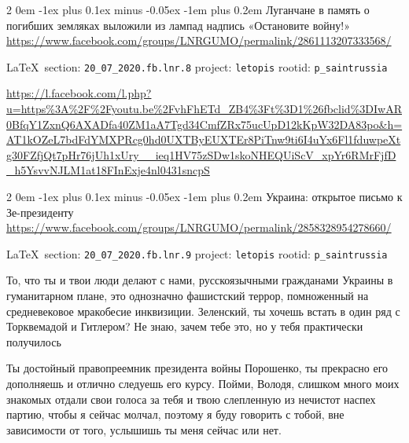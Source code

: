 \documentclass[a4paper,11pt]{extreport}
\makeatletter
\renewcommand\subsection{%
  \clearpage
    \@startsection{subsection}%
    {2}%
    {0em}%
    {-1ex plus 0.1ex minus -0.05ex}%
    {-1em plus 0.2em}%
    {\scshape\bfseries\Large}%
}
\makeatother
\begin{document}
 
 
\subsection{Луганчане в память о погибших земляках выложили из лампад надпись «Остановите войну!»}
\label{sec:20_07_2020.fb.lnr.8}
\url{https://www.facebook.com/groups/LNRGUMO/permalink/2861113207333568/}
  
\vspace{0.5cm}
{\small\LaTeX~section: \verb|20_07_2020.fb.lnr.8| project: \verb|letopis| rootid: \verb|p_saintrussia|}
\vspace{0.5cm}
  

\url{https://l.facebook.com/l.php?u=https%3A%2F%2Fyoutu.be%2FvhFhETd_ZB4%3Ft%3D1%26fbclid%3DIwAR0BfqY1ZxnQ6AXADfa40ZM1aA7Tgd34CmfZRx75ucUpD12kKpW32DA83po&h=AT1kOZeL7bdFdYMXPRcg0hd0UXTByEUXTEr8PiTnw9ti6I4uYx6Fl1fduwpeXtg30FZfjQt7pHr76jUh1xUry__ieq1HV75zSDw1skoNHEQUiScV_xpYr6RMrFjfD_h5YsvvNJLM1at18FInExje4nl0431sncpS}
 
 
\subsection{Украина: открытое письмо к Зе-президенту}
\label{sec:20_07_2020.fb.lnr.9}
\url{https://www.facebook.com/groups/LNRGUMO/permalink/2858328954278660/}
  
\vspace{0.5cm}
{\small\LaTeX~section: \verb|20_07_2020.fb.lnr.9| project: \verb|letopis| rootid: \verb|p_saintrussia|}
\vspace{0.5cm}


То, что ты и твои люди делают с нами, русскоязычными гражданами Украины в
гуманитарном плане, это однозначно фашистский террор, помноженный на
средневековое мракобесие инквизиции. Зеленский, ты хочешь встать в один ряд с
Торквемадой и Гитлером? Не знаю, зачем тебе это, но у тебя практически
получилось

Ты достойный правопреемник президента войны Порошенко, ты прекрасно его
дополняешь и отлично следуешь его курсу. Пойми, Володя, слишком много моих
знакомых отдали свои голоса за тебя и твою слепленную из нечистот наспех
партию, чтобы я сейчас молчал, поэтому я буду говорить с тобой, вне зависимости
от того, услышишь ты меня сейчас или нет.
\end{document}
